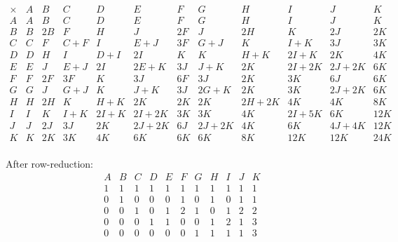 \documentclass[11pt,oneside]{article}
\newcommand{\thinplus}{\!+\!}
\begin{document}
{\small
$$
\begin{array}{r|rrrrrrrrrrr}
\times & A & B & C & D & E & F & G & H & I & J & K \\
\hline
A & A & B & C & D & E & F & G & H & I & J & K \\
B & B & 2B & F & H & J & 2F & J & 2H & K & 2J & 2K \\
C & C & F & C\thinplus F & I & E\thinplus J & 3F & G\thinplus J & K & I\thinplus K & 3J & 3K \\
D & D & H & I & D\thinplus I & 2I & K & K & H\thinplus K & 2I\thinplus K & 2K & 4K \\
E & E & J & E\thinplus J & 2I & 2E\thinplus K & 3J & J\thinplus K & 2K & 2I\thinplus 2K & 2J\thinplus 2K & 6K \\
F & F & 2F & 3F & K & 3J & 6F & 3J & 2K & 3K & 6J & 6K \\
G & G & J & G\thinplus J & K & J\thinplus K & 3J & 2G\thinplus K & 2K & 3K & 2J\thinplus 2K & 6K \\
H & H & 2H & K & H\thinplus K & 2K & 2K & 2K & 2H\thinplus 2K & 4K & 4K & 8K \\
I & I & K & I\thinplus K & 2I\thinplus K & 2I\thinplus 2K & 3K & 3K & 4K & 2I\thinplus 5K & 6K & 12K \\
J & J & 2J & 3J & 2K & 2J\thinplus 2K & 6J & 2J\thinplus 2K & 4K & 6K & 4J\thinplus 4K & 12K \\
K & K & 2K & 3K & 4K & 6K & 6K & 6K & 8K & 12K & 12K & 24K \\
\end{array}
$$
}

After row-reduction:
$$
\begin{array}{rrrrrrrrrrr}
 A & B & C & D & E & F & G & H & I & J & K \\
\hline
1 & 1 & 1 & 1 & 1 & 1 & 1 & 1 & 1 & 1 & 1 \\
0 & 1 & 0 & 0 & 0 & 1 & 0 & 1 & 0 & 1 & 1 \\
0 & 0 & 1 & 0 & 1 & 2 & 1 & 0 & 1 & 2 & 2 \\
0 & 0 & 0 & 1 & 1 & 0 & 0 & 1 & 2 & 1 & 3 \\
0 & 0 & 0 & 0 & 0 & 0 & 1 & 1 & 1 & 1 & 3 \\
\end{array}
$$


%
\end{document}
